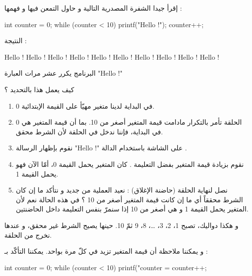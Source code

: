 إقرأ جيدا الشفرة المصدرية التالية و حاول التمعن فيها و فهمها :

\begin{Csource}
int counter = 0;
while (counter < 10)
{
	printf("Hello !\n");
	counter++;
}
\end{Csource}

النتيجة :

\begin{Console}
Hello !
Hello !
Hello !
Hello !
Hello !
Hello !
Hello !
Hello !
Hello !
Hello !
\end{Console}

البرنامج يكرر عشر مرات العبارة
"\textenglish{Hello !}"

\begin{question}
كيف يعمل هذا بالتحديد ؟
\end{question}

\begin{enumerate}
	\item في البداية لدينا متغير 
	مهيّأ على القيمة الإبتدائية 0.
	\item الحلقة 
تأمر بالتكرار مادامت قيمة المتغير
أصغر من 10. بما أن قيمة المتغير 
هي 0 في البداية، فإننا ندخل في الحلقة لأن الشرط محقق.
	\item نقوم بإظهار الرسالة 
	"\textenglish{Hello !}"
على الشاشة باستخدام الدالة 
.
	\item نقوم بزيادة قيمة المتغير 
بفضل التعليمة 
	.
كان المتغير
يحمل القيمة 0، أمّا الآن فهو يحمل القيمة 1.
	\item نصل لنهاية الحلقة (حاضنة الإغلاق) : نعيد العملية من جديد و نتأكد ما إن كان الشرط محققاً أي ما إن كانت قيمة المتغير أصغر من 10 ؟ في هذه الحالة نعم لأن المتغير
	يحمل القيمة 1 و هي أصغر من 10 إذا سنمرّ بنفس التعليمة داخل الحاضنتين.
\end{enumerate}

و هكذا دواليك،
تصبح 1، 2، 3، \dots، 8، 9 ثمّ 10. حينها يصيح الشرط 
غير محقق، و عندها نخرج من الحلقة.

و يمكننا ملاحظة أن قيمة المتغير
 تزيد في كلّ مرة بواحد. يمكننا التأكّد بـ :

\begin{Csource}
int counter = 0;
while (counter < 10)
{
	printf("counter = %
	counter++;
}
\end{Csource}

